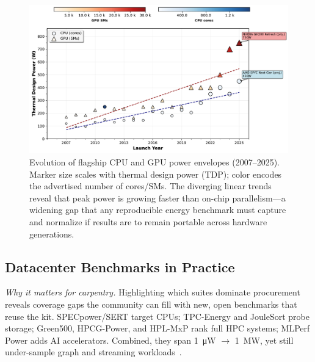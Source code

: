 \begin{figure}[ht]
  \centering
  \includegraphics[width=\columnwidth]{images/tdp_vs_cpu-gpu.pdf}
  \caption{ Evolution of flagship CPU and GPU power envelopes (2007–2025). Marker size scales with thermal design power (TDP); color encodes the advertised number of cores/SMs. The diverging linear trends reveal that peak power is growing faster than on-chip parallelism—a widening gap that any reproducible energy benchmark must capture and normalize if results are to remain portable across hardware generations.}
  \label{fig:tdp_scatter}
\end{figure}

\subsection{Datacenter Benchmarks in Practice}
\label{sec:energy:dcbench}

\textit{Why it matters for carpentry.}  
Highlighting which suites dominate procurement reveals coverage gaps the community can fill with new, open benchmarks that reuse the kit. SPECpower/SERT target CPUs; TPC-Energy and JouleSort probe storage; Green500, HPCG-Power, and HPL-MxP rank full HPC systems; MLPerf Power adds AI accelerators. Combined, they span \SI{1}{\micro\watt} $\rightarrow$ \SI{1}{\mega\watt}, yet still under-sample graph and streaming workloads~\cite{Tschand24MLPerfPower}.

